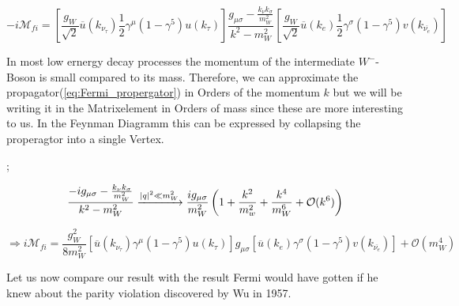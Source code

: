 \documentclass[../Bachelorarbeit.tex]{subfiles}
\begin{document}
\begin{equation}
    -i\mathcal{M}_{fi}= \left[ \frac{g_{W}}{\sqrt{2}} \overline{u}(k_{\nu_{\tau}})\frac{1}{2}\gamma^{\mu}(1-\gamma^{5})u(k_{\tau}) \right] \frac{g_{\mu\sigma}-\frac{k_{\nu}k_{\sigma}}{m_{W}^{2}}}{k^{2}-m_{W}^{2}} \left[ \frac{g_{W}}{\sqrt{2}} \overline{u}(k_{e})\frac{1}{2}\gamma^{\sigma}(1-\gamma^{5})v(k_{\overline{\nu_{e}}}) \right]
\end{equation}

In most low ernergy decay processes the momentum of the intermediate $W^{-}$-Boson is small compared to its mass. Therefore, we can approximate the
propagator(\ref{eq:Fermi_propergator}) in Orders of the momentum $k$ but we will be writing it in the Matrixelement in Orders
of mass since these are more interesting to us. In the Feynman Diagramm this can be expressed by collapsing the properagtor into a single Vertex.

\begin{center}
    ;
\end{center}
\begin{equation}
    \frac{-ig_{\mu\sigma}-\frac{k_{\nu}k_{\sigma}}{m_{W}^{2}}}{k^{2}-m_{W}^{2}} \xrightarrow{\abs{q}^{2} \ll m_{W}^{2}} \frac{ig_{\mu\sigma}}{m_{W}^{2}} \left( 1 + \frac{k^{2}}{m_{w}^{2}}+\frac{k^{4}}{m_{W}^{6}}+\mathcal{O}(k^6) \right)
    \label{eq:Fermi_propergator}
\end{equation}

\begin{equation}
    \Rightarrow i\mathcal{M}_{fi}=\frac{g_{W}^{2}}{8 m_{W}^{2}} \left[ \overline{u}(k_{\nu_{\tau}})\gamma^{\mu}(1-\gamma^{5})u(k_{\tau}) \right] g_{\mu\sigma} \left[ \overline{u}(k_{e})\gamma^{\sigma}(1-\gamma^{5})v(k_{\overline{\nu_{e}}}) \right] + \mathcal{O}(m_{W}^{4})
    \label{eq:Fermi_colapse}
\end{equation}

Let us now compare our result with the result Fermi would have gotten if he knew about the parity violation discovered by Wu in 1957.
\end{document}
